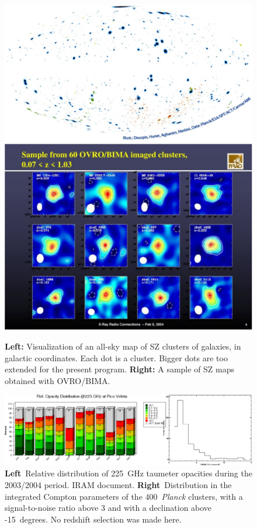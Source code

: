 \documentclass[10pt,a4paper,twoside,graphicx,color]{article}
\begin{document}
\begin{figure}
  \begin{center}
\includegraphics[width=0.45\columnwidth]{./Figures/Cat_all_colors_cr_DouspisEtAlCrop.pdf}
   \includegraphics[width=0.45\columnwidth]{./Figures/slide_8crop.pdf}
  \end{center}
\caption{{\bf Left:} Visualization of an all-sky map of SZ clusters of galaxies, in galactic coordinates. Each dot is a cluster. Bigger dots are too extended for the present program. {\bf Right: } A sample of SZ maps obtained with OVRO/BIMA. \cite{Reese2002}}

\label{Fig:AllSky}
\end{figure}
\begin{figure}
  \begin{center}
   \includegraphics[width=0.95\columnwidth]{./Figures/RelTau2004AndSZclustersCrop.pdf}
  \end{center}
  \caption{{\bf Left}~Relative distribution of 225~GHz taumeter
    opacities during the 2003/2004 period. IRAM document.  {\bf
      Right}~Distribution in the integrated Compton parameters of the
    400~{\sl Planck} clusters, with a signal-to-noise ratio above 3
    and with a declination above -15~degrees. No redshift selection
    was made here. }
\label{Fig:RelTau}
\end{figure}
\end{document}
